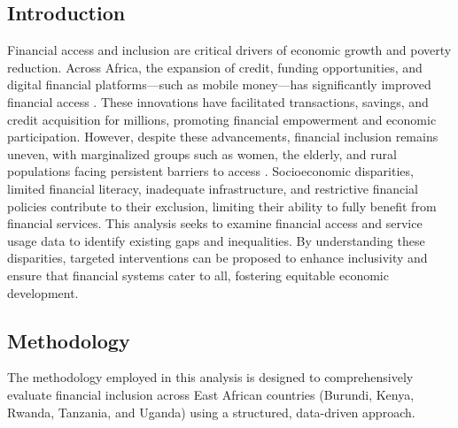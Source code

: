 \documentclass[preprint, 3p,
authoryear]{elsarticle} %
\begin{document}
\subsection{Introduction}\label{introduction-2}

Financial access and inclusion are critical drivers of economic growth
and poverty reduction. Across Africa, the expansion of credit, funding
opportunities, and digital financial platforms---such as mobile
money---has significantly improved financial access
\citep{suri2016long}. These innovations have facilitated transactions,
savings, and credit acquisition for millions, promoting financial
empowerment and economic participation. However, despite these
advancements, financial inclusion remains uneven, with marginalized
groups such as women, the elderly, and rural populations facing
persistent barriers to access \citep{allen2016african}. Socioeconomic
disparities, limited financial literacy, inadequate infrastructure, and
restrictive financial policies contribute to their exclusion, limiting
their ability to fully benefit from financial services. This analysis
seeks to examine financial access and service usage data to identify
existing gaps and inequalities. By understanding these disparities,
targeted interventions can be proposed to enhance inclusivity and ensure
that financial systems cater to all, fostering equitable economic
development.

\subsection{Methodology}\label{methodology-2}

The methodology employed in this analysis is designed to comprehensively
evaluate financial inclusion across East African countries (Burundi,
Kenya, Rwanda, Tanzania, and Uganda) using a structured, data-driven
approach.
\end{document}
